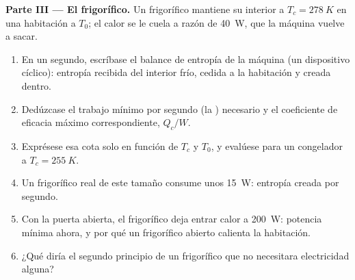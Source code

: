 \begin{problem}
\medskip
\noindent\textbf{Parte III --- El frigorífico.}
Un frigorífico mantiene su interior a $T_c = \qty{278}{K}$ en una habitación
a $T_0$; el calor se le cuela a razón de \qty{40}{W}, que la máquina vuelve a sacar.
\begin{enumerate}[resume]
  \item En un segundo, escríbase el balance de entropía de la máquina (un
        dispositivo cíclico): entropía recibida del interior frío, cedida a
        la habitación y creada dentro.
  \item Dedúzcase el trabajo mínimo por segundo (la )
        necesario y el coeficiente de eficacia máximo correspondiente,
        $Q_c/W$.
  \item Exprésese esa cota solo en función de $T_c$ y $T_0$, y evalúese
        para un congelador a $T_c = \qty{255}{K}$.
  \item Un frigorífico real de este tamaño consume unos \qty{15}{W}:
        entropía creada por segundo.
  \item Con la puerta abierta, el frigorífico deja entrar calor a
        \qty{200}{W}: potencia mínima ahora, y por qué un frigorífico
        abierto calienta la habitación.
  \item ¿Qué diría el segundo principio de un frigorífico que no
        necesitara electricidad alguna?
\end{enumerate}


\end{problem}
